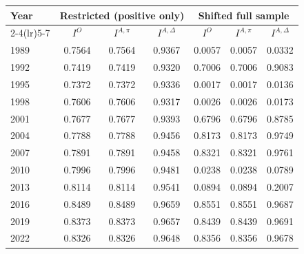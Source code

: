 \begin{tabular}{lcccccc}
\toprule
Year & \multicolumn{3}{c}{Restricted (positive only)} & \multicolumn{3}{c}{Shifted full sample} \\
\cmidrule(lr){2-4}\cmidrule(lr){5-7}
& $I^{O}$ & $I^{A,\pi}$ & $I^{A,\Delta}$ & $I^{O}$ & $I^{A,\pi}$ & $I^{A,\Delta}$ \\
\midrule
1989 & 0.7564 & 0.7564 & 0.9367 & 0.0057 & 0.0057 & 0.0332 \\
1992 & 0.7419 & 0.7419 & 0.9320 & 0.7006 & 0.7006 & 0.9083 \\
1995 & 0.7372 & 0.7372 & 0.9336 & 0.0017 & 0.0017 & 0.0136 \\
1998 & 0.7606 & 0.7606 & 0.9317 & 0.0026 & 0.0026 & 0.0173 \\
2001 & 0.7677 & 0.7677 & 0.9393 & 0.6796 & 0.6796 & 0.8785 \\
2004 & 0.7788 & 0.7788 & 0.9456 & 0.8173 & 0.8173 & 0.9749 \\
2007 & 0.7891 & 0.7891 & 0.9458 & 0.8321 & 0.8321 & 0.9761 \\
2010 & 0.7996 & 0.7996 & 0.9481 & 0.0238 & 0.0238 & 0.0789 \\
2013 & 0.8114 & 0.8114 & 0.9541 & 0.0894 & 0.0894 & 0.2007 \\
2016 & 0.8489 & 0.8489 & 0.9659 & 0.8551 & 0.8551 & 0.9687 \\
2019 & 0.8373 & 0.8373 & 0.9657 & 0.8439 & 0.8439 & 0.9691 \\
2022 & 0.8326 & 0.8326 & 0.9648 & 0.8356 & 0.8356 & 0.9678 \\
\bottomrule
\end{tabular}

